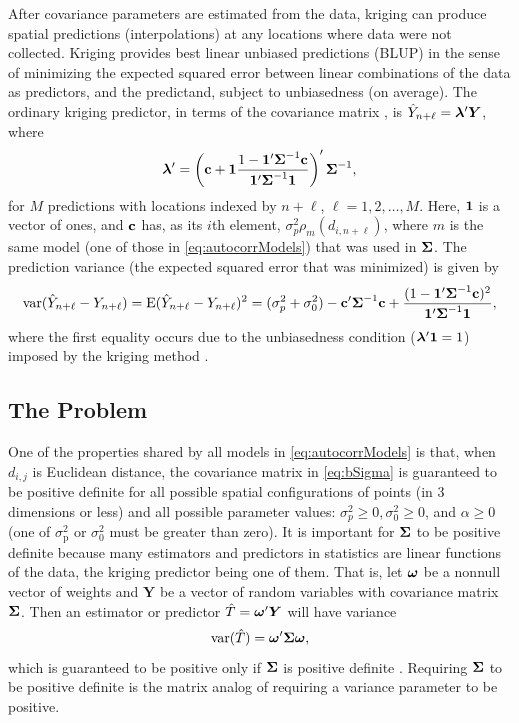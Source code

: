 \documentclass[11pt, titlepage]{article}\usepackage[]{graphicx}\usepackage[]{color}
\begin{document}
\begin{spacing}{1.9}
\begin{flushleft}
After covariance parameters are estimated from the data, kriging can produce spatial predictions (interpolations) at any locations where data were not collected.  Kriging provides best linear unbiased predictions (BLUP) in the sense of minimizing the expected squared error between linear combinations of the data as predictors, and the predictand, subject to unbiasedness (on average). The ordinary kriging predictor, in terms of the covariance matrix \citep[][p.33]{Scha:Gotw:stat:2005}, is $\hat{Y}_{n+\ell} ={\boldsymbol{\lambda}}^{\prime}\bm Y$, where
\begin{equation} \label{eq:OK}
	{\boldsymbol{\lambda}}^{\prime} = \left(\mathbf{c} + \mathbf{1}\frac{1 - \mathbf{1}^{\prime}\mbox{\boldmath $\Sigma$}^{-1}\mathbf{c}}{\mathbf{1}^{\prime}\mbox{\boldmath $\Sigma$}^{-1}\mathbf{1}}\right)^{\prime}\mbox{\boldmath $\Sigma$}^{-1}, 
\end{equation}
for $M$ predictions with locations indexed by $n+\ell$, $\ell = 1,2,\ldots,M$. Here, $\mathbf{1}$ is a vector of ones, and $\mathbf{c}$ has, as its $i$th element, $\sigma^2_p\rho_m(d_{i,n+\ell})$, where $m$ is the same model (one of those in \ref{eq:autocorrModels}) that was used in $\mbox{\boldmath $\Sigma$}$. The prediction variance (the expected squared error that was minimized) is given by
\begin{equation} \label{eq:OKse}
	\textrm{var}(\hat{Y}_{n+\ell} - Y_{n+\ell}) = \textrm{E}(\hat{Y}_{n+\ell} - Y_{n+\ell})^2 = (\sigma^2_p + \sigma^2_0) - \mathbf{c}^{\prime}\mbox{\boldmath $\Sigma$}^{-1}\mathbf{c} + \frac{(1 - \mathbf{1}^{\prime}\mbox{\boldmath $\Sigma$}^{-1}\mathbf{c})^2}{\mathbf{1}^{\prime}\mbox{\boldmath $\Sigma$}^{-1}\mathbf{1}},
\end{equation}
where the first equality occurs due to the unbiasedness condition (${\boldsymbol{\lambda}}^{\prime}\mathbf{1} = 1$) imposed by the kriging method \citep[e.g.,][p. 120-121]{Cres:stat:1993}.

\subsection*{The Problem}

One of the properties shared by all models in \ref{eq:autocorrModels} is that, when $d_{i,j}$ is Euclidean distance, the covariance matrix in \ref{eq:bSigma} is guaranteed to be positive definite for all possible spatial configurations of points (in 3 dimensions or less) and all possible parameter values:  $\sigma^2_p \ge 0, \sigma^2_0 \ge 0$, and $\alpha \ge 0$ (one of $\sigma^2_\textrm{p}$ or $\sigma^2_0$ must be greater than zero). It is important for $\mbox{\boldmath $\Sigma$}$ to be positive definite because many estimators and predictors in statistics are linear functions of the data, the kriging predictor being one of them.  That is, let $\mbox{\boldmath $\omega$}$ be a nonnull vector of weights and $\bm Y$ be a vector of random variables with covariance matrix $\mbox{\boldmath $\Sigma$}$.  Then an estimator or predictor $\hat{T} = \mbox{\boldmath $\omega$}^{\prime}\bm Y$ will have variance
\begin{equation} \label{eq:quadForm}
  \textrm{var}(\hat{T}) = \mbox{\boldmath $\omega$}^{\prime}\mbox{\boldmath $\Sigma$}\mbox{\boldmath $\omega$},
\end{equation}
which is guaranteed to be positive only if $\mbox{\boldmath $\Sigma$}$ is positive definite \citep{Guil:Schi:Porc:Bevi:vali:2014}.  Requiring $\mbox{\boldmath $\Sigma$}$ to be positive definite is the matrix analog of requiring a variance parameter to be positive.  


\end{flushleft}
\end{spacing}
\end{document}
